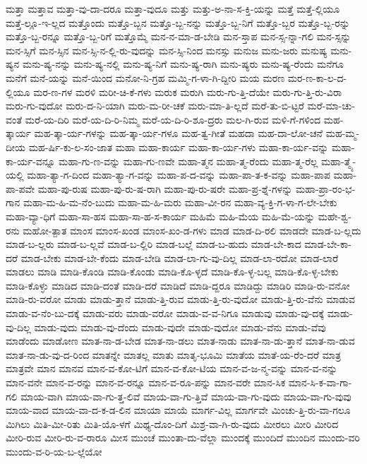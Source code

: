 {ಮತ್ತಾ
ಮತ್ತಾವ
ಮತ್ತಾ-ವು-ದಾ-ದರೂ
ಮತ್ತಾ-ವುದೂ
ಮತ್ತು
ಮತ್ತು-ಅ-ನಾ-ಸ-ಕ್ತಿ-ಯನ್ನು
ಮತ್ತೆ
ಮತ್ತೆ-ಲ್ಲಿಯೂ
ಮತ್ತೆ-ಲ್ಲೂ-ಇ-ಲ್ಲದ
ಮತ್ತೊಂದು
ಮತ್ತೊ-ಬ್ಬನ
ಮತ್ತೊ-ಬ್ಬ-ನನ್ನು
ಮತ್ತೊ-ಬ್ಬ-ನಿಗೆ
ಮತ್ತೊ-ಬ್ಬರ
ಮತ್ತೊ-ಬ್ಬ-ರನ್ನು
ಮತ್ತೊ-ಬ್ಬ-ರನ್ನೂ
ಮತ್ತೊ-ಬ್ಬ-ರಿಗೆ
ಮತ್ತೊಮ್ಮೆ
ಮನ-ನ-ಮಾ-ಡ-ಬೇಡಿ
ಮನ-ಸ್ತಾಪ
ಮನ-ಸ್ಸ-ನ್ನಾ-ಗಲಿ
ಮನ-ಸ್ಸನ್ನು
ಮನ-ಸ್ಸಿಗೆ
ಮನ-ಸ್ಸಿನ
ಮನ-ಸ್ಸಿ-ನ-ಲ್ಲಿ-ರು-ವುದನ್ನು
ಮನ-ಸ್ಸಿ-ನಿಂದ
ಮನಸ್ಸು
ಮನುಜ
ಮನು-ಜರು
ಮನುಷ್ಯ
ಮನು-ಷ್ಯನ
ಮನು-ಷ್ಯ-ನನ್ನು
ಮನು-ಷ್ಯ-ನಲ್ಲಿ
ಮನು-ಷ್ಯ-ನಿಗೆ
ಮನು-ಷ್ಯ-ರಾಗಿ
ಮನು-ಷ್ಯರು
ಮನು-ಷ್ಯ-ರೆಂದು
ಮನೆಗೂ
ಮನೆಗೆ
ಮನೆ-ಯನ್ನು
ಮನೆ-ಯಿಂದ
ಮನೋ-ನಿ-ಗ್ರಹ
ಮಮ್ಮಿ-ಗ-ಳಾ-ಗಿ-ದ್ದೀರಿ
ಮಯ
ಮರಣ
ಮರ-ಣ-ಕಾ-ಲ-ದ-ಲ್ಲಿಯೂ
ಮರ-ಣ-ಗಳ
ಮರಳಿ
ಮರೀ-ಚಿ-ಕೆ-ಗಳು
ಮರುಕ
ಮರುಗಿ
ಮರು-ಗು-ತ್ತಿ-ದೆಯೇ
ಮರು-ಗು-ತ್ತಿ-ರು-ವಿರಾ
ಮರು-ಗು-ವುದೋ
ಮರು-ದ-ನಿ-ಯಾಗಿ
ಮರು-ಮ-ರೀ-ಚಕೆ
ಮರು-ಮಾ-ತಿ-ಲ್ಲದೆ
ಮರೆ-ತು-ಬಿ-ಟ್ಟರೆ
ಮರೆ-ಮಾ-ಚು-ವಂತೆ
ಮರೆ-ಯ-ದಿರಿ
ಮರೆ-ಯ-ದಿ-ರಿ-ನಿಮ್ಮ
ಮರೆ-ಯ-ದಿ-ರಿ-ಶೂ-ದ್ರರು
ಮಲ-ಗಿ-ರುವ
ಮಳಿ-ಗೆ-ಗಳಿಂದ
ಮಹ-ತ್ಕಾರ್ಯ
ಮಹ-ತ್ಕಾ-ರ್ಯ-ಗಳನ್ನು
ಮಹ-ತ್ಕಾ-ರ್ಯ-ಗಳೂ
ಮಹ-ತ್ವ-ಗೀತೆ
ಮಹದಾ
ಮಹ-ದಾ-ಲೋ-ಚನೆ
ಮಹ-ಮ್ಮ-ದೀಯ
ಮಹ-ರ್ಷಿ-ಕು-ಲ-ಸಂ-ಜಾತ
ಮಹಾ
ಮಹಾ-ಕಾರ್ಯ
ಮಹಾ-ಕಾ-ರ್ಯ-ಗಳು
ಮಹಾ-ಕಾ-ರ್ಯ-ವನ್ನು
ಮಹಾ-ಕಾ-ರ್ಯ-ವನ್ನೂ
ಮಹಾ-ಗು-ಣ-ವನ್ನು
ಮಹಾ-ಗು-ಣವೇ
ಮಹಾ-ತ್ಮನ
ಮಹಾ-ತ್ಮ-ರೆಂದು
ಮಹಾ-ತ್ಮ-ರೆಲ್ಲ
ಮಹಾ-ತ್ಮ್ಯೆ-ಯಲ್ಲಿ
ಮಹಾ-ತ್ಯಾ-ಗ-ದಿಂದ
ಮಹಾ-ತ್ಯಾ-ಗ-ವನ್ನು
ಮಹಾ-ಪ-ದ-ವನ್ನು
ಮಹಾ-ಪಾ-ತ-ಕ-ವನ್ನು
ಮಹಾ-ಪಾಪ
ಮಹಾ-ಪಾ-ಪವೇ
ಮಹಾ-ಪು-ರುಷ
ಮಹಾ-ಪು-ರು-ಷ-ರಾಗಿ
ಮಹಾ-ಪು-ರು-ಷರೇ
ಮಹಾ-ಪ್ರ-ಶ್ನೆ-ಗಳನ್ನು
ಮಹಾ-ಪ್ರಾ-ರಂ-ಭ-ಗಾನ
ಮಹಾ-ಮ-ಹಿ-ಮ-ನೆಂ-ಬುದು
ಮಹಾ-ಮ-ಹಿ-ಮರು
ಮಹಾ-ವೀ-ರನ
ಮಹಾ-ವ್ಯ-ಕ್ತಿ-ಗ-ಳಾ-ಗ-ಲೇ-ಬೇಕು
ಮಹಾ-ವ್ಯಾ-ಧಿಗೆ
ಮಹಾ-ಸಾ-ಹಸ
ಮಹಾ-ಸಾ-ಹ-ಸ-ಕಾರ್ಯ
ಮಹಿಮೆ
ಮಹಿ-ಮೆಯ
ಮಹಿ-ಮೆ-ಯನ್ನು
ಮಹೇ-ಶ್ವ-ರನು
ಮಹೋ-ತ್ಪಾತ
ಮಾಂಸ
ಮಾಂಸ-ಖಂಡ
ಮಾಂಸ-ಖಂ-ಡ-ಗಳು
ಮಾಡ
ಮಾಡ-ದಿ-ರಲಿ
ಮಾಡದೇ
ಮಾಡ-ಬ-ಲ್ಲದು
ಮಾಡ-ಬ-ಲ್ಲರು
ಮಾಡ-ಬ-ಲ್ಲವೆ
ಮಾಡ-ಬ-ಲ್ಲಿರಿ
ಮಾಡ-ಬಲ್ಲೆ
ಮಾಡ-ಬ-ಹುದು
ಮಾಡ-ಬೇ-ಕಾದ
ಮಾಡ-ಬೇ-ಕಾ-ದರೆ
ಮಾಡ-ಬೇಕು
ಮಾಡ-ಬೇ-ಕೆಂದು
ಮಾಡ-ಬೇಡಿ
ಮಾಡ-ಲಾ-ಗು-ವು-ದಿಲ್ಲ
ಮಾಡ-ಲಾ-ರದೋ
ಮಾಡ-ಲಾರೆ
ಮಾಡಲು
ಮಾಡಿ
ಮಾಡಿ-ಕೊಂಡಿ
ಮಾಡಿ-ಕೊಂಡು
ಮಾಡಿ-ಕೊ-ಳ್ಳದೆ
ಮಾಡಿ-ಕೊ-ಳ್ಳ-ಬಲ್ಲ
ಮಾಡಿ-ಕೊ-ಳ್ಳ-ಬೇಕು
ಮಾಡಿ-ಕೊಳ್ಳು
ಮಾಡಿದ
ಮಾಡಿ-ದಂತೆ
ಮಾಡಿ-ದರೆ
ಮಾಡಿದೆ
ಮಾಡಿ-ದ್ದರೂ
ಮಾಡಿದ್ದು
ಮಾಡಿರಿ
ಮಾಡಿ-ರು-ವನೋ
ಮಾಡಿ-ರು-ವರೋ
ಮಾಡು
ಮಾಡು-ತ್ತಾನೆ
ಮಾಡು-ತ್ತಿ-ರುವ
ಮಾಡು-ತ್ತಿ-ರು-ವುದೋ
ಮಾಡು-ತ್ತಿ-ರು-ವೆನು
ಮಾಡುವ
ಮಾಡು-ವ-ನೆಂ-ಬು-ದಕ್ಕೆ
ಮಾಡು-ವರು
ಮಾಡು-ವರೋ
ಮಾಡು-ವ-ವ-ನಿಗೂ
ಮಾಡುವು
ಮಾಡು-ವು-ದಕ್ಕೆ
ಮಾಡು-ವು-ದಿಲ್ಲ
ಮಾಡು-ವುದು
ಮಾಡು-ವು-ದೆಂದು
ಮಾಡು-ವುದೇ
ಮಾಡು-ವುದೋ
ಮಾಡು-ವೆನು
ಮಾಡು-ವೆವು
ಮಾಡೆಂದು
ಮಾಡೋಣ
ಮಾತ-ನಾ-ಡ-ಬೇಡ
ಮಾತ-ನಾ-ಡಲು
ಮಾತ-ನಾಡು
ಮಾತ-ನಾ-ಡು-ತ್ತಾನೆ
ಮಾತ-ನಾ-ಡುವ
ಮಾತ-ನಾ-ಡು-ವು-ದ-ರಿಂದ
ಮಾತನ್ನೇ
ಮಾತಲ್ಲ
ಮಾತು
ಮಾತೃ-ಭೂಮಿ
ಮಾತೆಯ
ಮಾತೆ-ಯ-ರೆಂ-ದರೆ
ಮಾತ್ರ
ಮಾತ್ರವೇ
ಮಾನ
ಮಾನವ
ಮಾನ-ವ-ಕೋ-ಟಿಗೆ
ಮಾನ-ವ-ಕೋ-ಟಿಯ
ಮಾನ-ವ-ಜ-ನ್ಮ-ವನ್ನು
ಮಾನ-ವ-ನನ್ನು
ಮಾನ-ವನೇ
ಮಾನ-ವ-ರನ್ನು
ಮಾನ-ವ-ರನ್ನೂ
ಮಾನ-ವ-ರೂ-ಪನ್ನು
ಮಾನ-ವರೇ
ಮಾನ-ಸಿಕ
ಮಾನ-ಸಿ-ಕ-ವಾ-ಗಾ-ಗಲಿ
ಮಾಯ-ವಾಗಿ
ಮಾಯ-ವಾ-ಗು-ತ್ತ-ಲಿವೆ
ಮಾಯ-ವಾ-ಗು-ತ್ತಿವೆ
ಮಾಯ-ವಾ-ಗು-ವುದು
ಮಾಯ-ವಾ-ಗು-ವುವು
ಮಾಯ-ವಾದ
ಮಾಯ-ವಾ-ದ-ಕ-ಡ-ಲಿನ
ಮಾಯಾ
ಮಾಯೆ
ಮಾರ್ಗ-ವಿಲ್ಲ
ಮಾರ್ಗವೇ
ಮಿಂಚು-ತ್ತಿ-ರು-ವಾ-ಗಲೂ
ಮಿಗಿಲು
ಮಿತಿ-ಮೀ-ರಿತು
ಮಿತಿ-ಯೊ-ಳಗೆ
ಮಿಥ್ಯ-ದೊಂ-ದಿಗೆ
ಮಿಶ್ರ-ವಾ-ಗಿ-ರು-ವುದು
ಮೀರಲು
ಮೀರಿ
ಮೀರಿದ
ಮೀರಿ-ರುವ
ಮೀರಿ-ರು-ವ-ರಾರೂ
ಮೀಸ
ಮುಂಚೆ
ಮುಂತಾ-ದು-ವೆಲ್ಲಾ
ಮುಂದಕ್ಕೆ
ಮುಂದಿದೆ
ಮುಂದಿನ
ಮುಂದು-ವರಿ
ಮುಂದು-ವ-ರಿ-ಯ-ಬ-ಲ್ಲೆಯೋ
}
